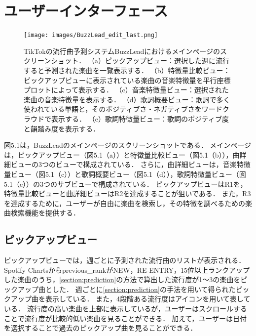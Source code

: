 \documentclass[titlepage]{jsreport}
\begin{document}
\chapter{ユーザーインターフェース}
\begin{figure}[htb]
\begin{center}
\texttt{[image: images/BuzzLead\_edit\_last.png]}
\label{fig:BuzzLead}
\caption{
  TikTokの流行曲予測システムBuzzLeadにおけるメインページのスクリーンショット．
  （a）ピックアップビュー：選択した週に流行すると予測された楽曲を一覧表示する．
  （b）特徴量比較ビュー：ピックアップビューに表示されている楽曲の音楽特徴量を平行座標プロットによって表示する．
  （c）音楽特徴量ビュー：選択された楽曲の音楽特徴量を表示する．
  （d）歌詞概要ビュー：歌詞で多く使われている単語と，そのポジティブさ・ネガティブさをワードクラウドで表示する．
  （e）歌詞特徴量ビュー：歌詞のポジティブ度と韻踏み度を表示する．
}
\end{center}
\end{figure}

\label{section:user-interface}
図5.1は，BuzzLeadのメインページのスクリーンショットである．
メインページは，ピックアップビュー（図5.1（a））と特徴量比較ビュー（図5.1（b）），曲詳細ビューの3つのビューで構成されている．
さらに，曲詳細ビューは，音楽特徴量ビュー（図5.1（c））と歌詞概要ビュー（図5.1（d）），歌詞特徴量ビュー（図5.1（e））の3つのサブビューで構成されている．
ピックアップビューはR1を，特徴量比較ビューと曲詳細ビューはR2を達成することが狙いである．
また，R3を達成するために，ユーザーが自由に楽曲を検索し，その特徴を調べるための楽曲検索機能を提供する．

\section{ピックアップビュー}
ピックアップビューでは，週ごとに予測された流行曲のリストが表示される．
Spotify Chartsからprevious\_rankがNEW，RE-ENTRY，15位以上ランクアップした楽曲のうち，\ref{section:prediction}の方法で算出した流行度が1～3の楽曲をピックアップ曲とした．
週ごとに\ref{section:prediction}の手法を用いて得られたピックアップ曲を表示している．
また，4段階ある流行度はアイコンを用いて表している．
流行度の高い楽曲を上部に表示しているが，ユーザーはスクロールすることで流行度が比較的低い楽曲を見ることができる．
加えて，ユーザーは日付を選択することで過去のピックアップ曲を見ることができる．
\end{document}
